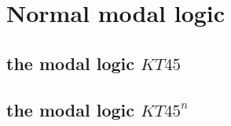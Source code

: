 

\section{Normal modal logic} %
\label{sec:normal_modal_logic}

\subsection{the modal logic $KT45$} %
\label{sub:the_normal_modal_logic_s5_}


\subsection{the modal logic $KT45^n$} %
\label{sub:the_modal_logic_kt45_n_}


